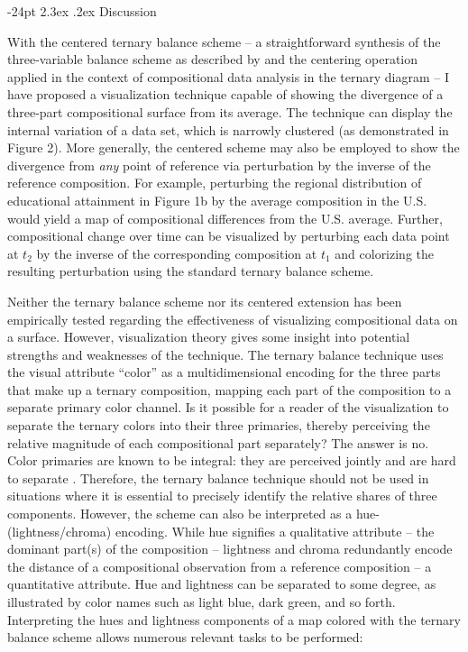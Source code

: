 \documentclass[10pt,twoside,reqno]{article}
\makeatletter
\renewcommand\section{\@startsection {section}{1}{\z@}%
                                   {-24pt}%
                                   {2.3ex \@plus.2ex}%
                                   {\normalfont\large\bfseries}}
\makeatother
\begin{document}
\hypertarget{discussion}{%
\section{Discussion}\label{discussion}}

With the centered ternary balance scheme -- a straightforward synthesis
of the three-variable balance scheme as described by \citet{Brewer1994}
and the centering operation applied in the context of compositional data
analysis in the ternary diagram \citep{VonEynatten2002} -- I have
proposed a visualization technique capable of showing the divergence of
a three-part compositional surface from its average. The technique can
display the internal variation of a data set, which is narrowly
clustered (as demonstrated in Figure 2). More generally, the centered
scheme may also be employed to show the divergence from \emph{any} point
of reference via perturbation by the inverse of the reference
composition. For example, perturbing the regional distribution of
educational attainment in Figure 1b by the average composition in the
U.S. would yield a map of compositional differences from the U.S.
average. Further, compositional change over time can be visualized by
perturbing each data point at \(t_2\) by the inverse of the
corresponding composition at \(t_1\) \citep{Aitchison2005a} and
colorizing the resulting perturbation using the standard ternary balance
scheme.

Neither the ternary balance scheme nor its centered extension has been
empirically tested regarding the effectiveness of visualizing
compositional data on a surface. However, visualization theory gives
some insight into potential strengths and weaknesses of the technique.
The ternary balance technique uses the visual attribute ``color'' as a
multidimensional encoding for the three parts that make up a ternary
composition, mapping each part of the composition to a separate primary
color channel. Is it possible for a reader of the visualization to
separate the ternary colors into their three primaries, thereby
perceiving the relative magnitude of each compositional part separately?
The answer is no. Color primaries are known to be integral: they are
perceived jointly and are hard to separate \citep{Ware2013}. Therefore,
the ternary balance technique should not be used in situations where it
is essential to precisely identify the relative shares of three
components. However, the scheme can also be interpreted as a
hue-(lightness/chroma) encoding. While hue signifies a qualitative
attribute -- the dominant part(s) of the composition -- lightness and
chroma redundantly encode the distance of a compositional observation
from a reference composition -- a quantitative attribute. Hue and
lightness can be separated to some degree, as illustrated by color names
such as light blue, dark green, and so forth. Interpreting the hues and
lightness components of a map colored with the ternary balance scheme
allows numerous relevant tasks to be performed:
\end{document}
